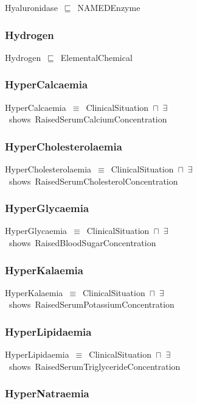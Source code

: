 \documentclass{article}
\begin{document}
Hyaluronidase~\ensuremath{\sqsubseteq}~NAMEDEnzyme~

\subsubsection*{Hydrogen}

Hydrogen~\ensuremath{\sqsubseteq}~ElementalChemical~

\subsubsection*{HyperCalcaemia}

HyperCalcaemia~\ensuremath{\equiv}~ClinicalSituation~\ensuremath{\sqcap}~\ensuremath{\exists}~shows~RaisedSerumCalciumConcentration

\subsubsection*{HyperCholesterolaemia}

HyperCholesterolaemia~\ensuremath{\equiv}~ClinicalSituation~\ensuremath{\sqcap}~\ensuremath{\exists}~shows~RaisedSerumCholesterolConcentration

\subsubsection*{HyperGlycaemia}

HyperGlycaemia~\ensuremath{\equiv}~ClinicalSituation~\ensuremath{\sqcap}~\ensuremath{\exists}~shows~RaisedBloodSugarConcentration

\subsubsection*{HyperKalaemia}

HyperKalaemia~\ensuremath{\equiv}~ClinicalSituation~\ensuremath{\sqcap}~\ensuremath{\exists}~shows~RaisedSerumPotassiumConcentration

\subsubsection*{HyperLipidaemia}

HyperLipidaemia~\ensuremath{\equiv}~ClinicalSituation~\ensuremath{\sqcap}~\ensuremath{\exists}~shows~RaisedSerumTriglycerideConcentration

\subsubsection*{HyperNatraemia}
\end{document}
